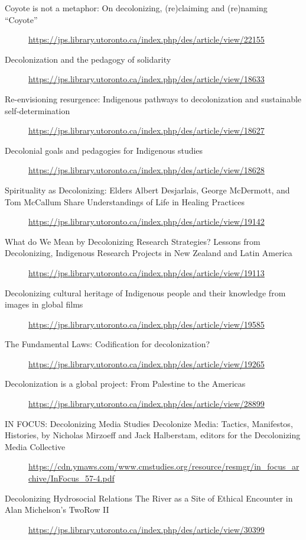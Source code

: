 \documentclass[11pt]{article}
\begin{document}
\begin{itemize}
\begin{description}
\item[{Coyote is not a metaphor: On decolonizing, (re)claiming and (re)naming “Coyote”}] \url{https://jps.library.utoronto.ca/index.php/des/article/view/22155}

\item[{Decolonization and the pedagogy of solidarity}] \url{https://jps.library.utoronto.ca/index.php/des/article/view/18633}

\item[{Re-envisioning resurgence: Indigenous pathways to decolonization and sustainable self-determination}] \url{https://jps.library.utoronto.ca/index.php/des/article/view/18627}

\item[{Decolonial goals and pedagogies for Indigenous studies}] \url{https://jps.library.utoronto.ca/index.php/des/article/view/18628}

\item[{Spirituality as Decolonizing: Elders Albert Desjarlais, George McDermott, and Tom McCallum Share Understandings of Life in Healing Practices}] \url{https://jps.library.utoronto.ca/index.php/des/article/view/19142}

\item[{What do We Mean by Decolonizing Research Strategies? Lessons from Decolonizing, Indigenous Research Projects in New Zealand and Latin America}] \url{https://jps.library.utoronto.ca/index.php/des/article/view/19113}

\item[{Decolonizing cultural heritage of Indigenous people and their knowledge from images in global films}] \url{https://jps.library.utoronto.ca/index.php/des/article/view/19585}

\item[{The Fundamental Laws: Codification for decolonization?}] \url{https://jps.library.utoronto.ca/index.php/des/article/view/19265}

\item[{Decolonization is a global project: From Palestine to the Americas}] \url{https://jps.library.utoronto.ca/index.php/des/article/view/28899}

\item[{IN FOCUS: Decolonizing Media Studies Decolonize Media: Tactics, Manifestos, Histories, by Nicholas Mirzoeff and Jack Halberstam, editors for the Decolonizing Media Collective}] \url{https://cdn.ymaws.com/www.cmstudies.org/resource/resmgr/in\_focus\_archive/InFocus\_57-4.pdf}

\item[{Decolonizing Hydrosocial Relations The River as a Site of Ethical Encounter in Alan Michelson's TwoRow II}] \url{https://jps.library.utoronto.ca/index.php/des/article/view/30399}


\end{description}
\end{itemize}
\end{document}
